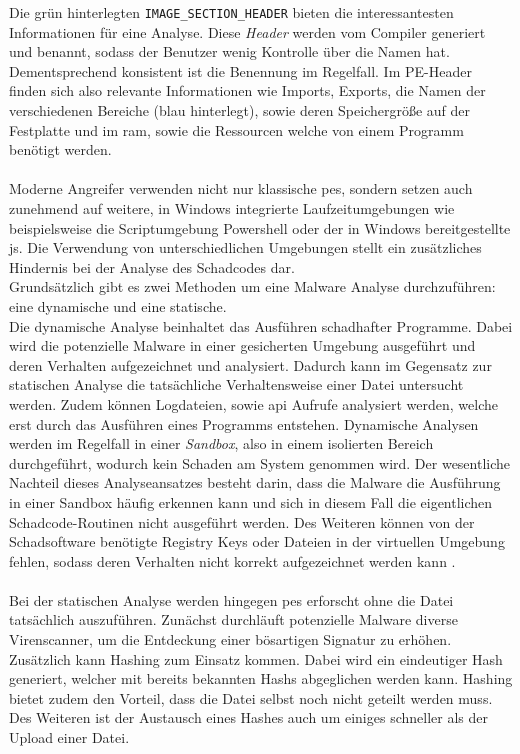 \documentclass[
    12pt, %
    DIV10,
    ngerman, %
    a4paper, %
    oneside, %
    titlepage, %
    parskip=half, %
    headings=normal, %
    listof=totoc, %
    bibliography=totoc, %
    index=totoc, %
    captions=tableheading, %
    final %
]{scrreprt}
\begin{document}
Die grün hinterlegten \texttt{IMAGE\_SECTION\_HEADER} bieten die interessantesten Informationen für eine Analyse. Diese \emph{Header} werden vom Compiler generiert und benannt, sodass der Benutzer wenig Kontrolle über die Namen hat. Dementsprechend konsistent ist die Benennung im Regelfall. Im PE-Header finden sich also relevante Informationen wie Imports, Exports, die Namen der verschiedenen Bereiche (blau hinterlegt), sowie deren Speichergrö{\ss}e auf der Festplatte und im \ac{ram}, sowie die Ressourcen welche von einem Programm benötigt werden.
\\\\
Moderne Angreifer verwenden nicht nur klassische \ac{pes}, sondern setzen auch zunehmend auf weitere, in Windows integrierte Laufzeitumgebungen wie beispielsweise die Scriptumgebung Powershell oder der in Windows bereitgestellte \ac{js}. Die Verwendung von unterschiedlichen Umgebungen stellt ein zusätzliches Hindernis bei der Analyse des Schadcodes dar.\\
Grundsätzlich gibt es zwei Methoden um eine Malware Analyse durchzuführen: eine dynamische und eine statische.\\
Die dynamische Analyse beinhaltet das Ausführen schadhafter Programme. Dabei wird die potenzielle Malware in einer gesicherten Umgebung ausgeführt und deren Verhalten aufgezeichnet und analysiert. Dadurch kann im Gegensatz zur statischen Analyse die tatsächliche Verhaltensweise einer Datei untersucht werden. Zudem können Logdateien, sowie \ac{api} Aufrufe analysiert werden, welche erst durch das Ausführen eines Programms entstehen.
Dynamische Analysen werden im Regelfall in einer \emph{Sandbox}, also in einem isolierten Bereich durchgeführt, wodurch kein Schaden am System genommen wird.
Der wesentliche Nachteil dieses Analyseansatzes besteht darin, dass die Malware die Ausführung in einer Sandbox häufig erkennen kann und sich in diesem Fall die eigentlichen Schadcode-Routinen nicht ausgeführt werden. Des Weiteren können von der Schadsoftware benötigte Registry Keys oder Dateien in der virtuellen Umgebung fehlen, sodass deren Verhalten nicht korrekt aufgezeichnet werden kann \parencite{Sikorski2012}.\\\\
Bei der statischen Analyse werden hingegen \ac{pes} erforscht ohne die Datei tatsächlich auszuführen. Zunächst durchläuft potenzielle Malware diverse Virenscanner, um die Entdeckung einer bösartigen Signatur zu erhöhen.\\ 
Zusätzlich kann Hashing zum Einsatz kommen. Dabei wird ein eindeutiger Hash generiert, welcher mit bereits bekannten Hashs abgeglichen werden kann. Hashing bietet zudem den Vorteil, dass die Datei selbst noch nicht geteilt werden muss. Des Weiteren ist der Austausch eines Hashes auch um einiges schneller als der Upload einer Datei.\\
\end{document}
